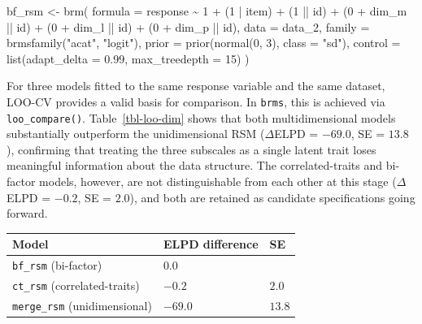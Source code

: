 \documentclass[
  man,
  floatsintext,
  longtable,
  nolmodern,
  notxfonts,
  notimes,
  colorlinks=true,linkcolor=blue,citecolor=blue,urlcolor=blue]{apa7}
\newenvironment{Shaded}{\begin{snugshade}}{\end{snugshade}}
\newcommand{\AttributeTok}[1]{\textcolor[rgb]{0.40,0.45,0.13}{#1}}
\newcommand{\DecValTok}[1]{\textcolor[rgb]{0.68,0.00,0.00}{#1}}
\newcommand{\FloatTok}[1]{\textcolor[rgb]{0.68,0.00,0.00}{#1}}
\newcommand{\FunctionTok}[1]{\textcolor[rgb]{0.28,0.35,0.67}{#1}}
\newcommand{\NormalTok}[1]{\textcolor[rgb]{0.00,0.23,0.31}{#1}}
\newcommand{\OtherTok}[1]{\textcolor[rgb]{0.00,0.23,0.31}{#1}}
\newcommand{\SpecialCharTok}[1]{\textcolor[rgb]{0.37,0.37,0.37}{#1}}
\newcommand{\StringTok}[1]{\textcolor[rgb]{0.13,0.47,0.30}{#1}}
\begin{document}
\begin{Shaded}
\begin{Highlighting}[]
\NormalTok{bf\_rsm }\OtherTok{\textless{}{-}} \FunctionTok{brm}\NormalTok{(}
  \AttributeTok{formula =}\NormalTok{ response }\SpecialCharTok{\textasciitilde{}} \DecValTok{1} \SpecialCharTok{+}\NormalTok{ (}\DecValTok{1} \SpecialCharTok{|}\NormalTok{ item) }\SpecialCharTok{+}
\NormalTok{    (}\DecValTok{1} \SpecialCharTok{||}\NormalTok{ id) }\SpecialCharTok{+}                        
\NormalTok{    (}\DecValTok{0} \SpecialCharTok{+}\NormalTok{ dim\_m }\SpecialCharTok{||}\NormalTok{ id) }\SpecialCharTok{+}               
\NormalTok{    (}\DecValTok{0} \SpecialCharTok{+}\NormalTok{ dim\_l }\SpecialCharTok{||}\NormalTok{ id) }\SpecialCharTok{+}           
\NormalTok{    (}\DecValTok{0} \SpecialCharTok{+}\NormalTok{ dim\_p }\SpecialCharTok{||}\NormalTok{ id),               }
  \AttributeTok{data =}\NormalTok{ data\_2,}
  \AttributeTok{family =} \FunctionTok{brmsfamily}\NormalTok{(}\StringTok{"acat"}\NormalTok{, }\StringTok{"logit"}\NormalTok{),}
  \AttributeTok{prior =} \FunctionTok{prior}\NormalTok{(}\FunctionTok{normal}\NormalTok{(}\DecValTok{0}\NormalTok{, }\DecValTok{3}\NormalTok{), }\AttributeTok{class =} \StringTok{"sd"}\NormalTok{),}
  \AttributeTok{control =} \FunctionTok{list}\NormalTok{(}\AttributeTok{adapt\_delta =} \FloatTok{0.99}\NormalTok{, }\AttributeTok{max\_treedepth =} \DecValTok{15}\NormalTok{)}
\NormalTok{)}
\end{Highlighting}
\end{Shaded}

For three models fitted to the same response variable and the same
dataset, LOO-CV provides a valid basis for comparison. In \texttt{brms},
this is achieved via \texttt{loo\_compare()}. Table~\ref{tbl-loo-dim}
shows that both multidimensional models substantially outperform the
unidimensional RSM (\(\Delta\)ELPD = \(-69.0\), SE = \(13.8\)),
confirming that treating the three subscales as a single latent trait
loses meaningful information about the data structure. The
correlated-traits and bi-factor models, however, are not distinguishable
from each other at this stage (\(\Delta\)ELPD = \(-0.2\), SE = \(2.0\)),
and both are retained as candidate specifications going forward.

\begin{table}

{\caption{{LOO-CV comparison of dimensional structures. Models are
ordered by ELPD; differences are relative to the best-fitting
model.}{\label{tbl-loo-dim}}}
\vspace{-20pt}}

\begin{longtable}[]{@{}lll@{}}
\toprule\noalign{}
Model & ELPD difference & SE \\
\midrule\noalign{}
\endhead
\bottomrule\noalign{}
\endlastfoot
\texttt{bf\_rsm} (bi-factor) & \(0.0\) & \\
\texttt{ct\_rsm} (correlated-traits) & \(-0.2\) & \(2.0\) \\
\texttt{merge\_rsm} (unidimensional) & \(-69.0\) & \(13.8\) \\
\end{longtable}

\end{table}
\end{document}
